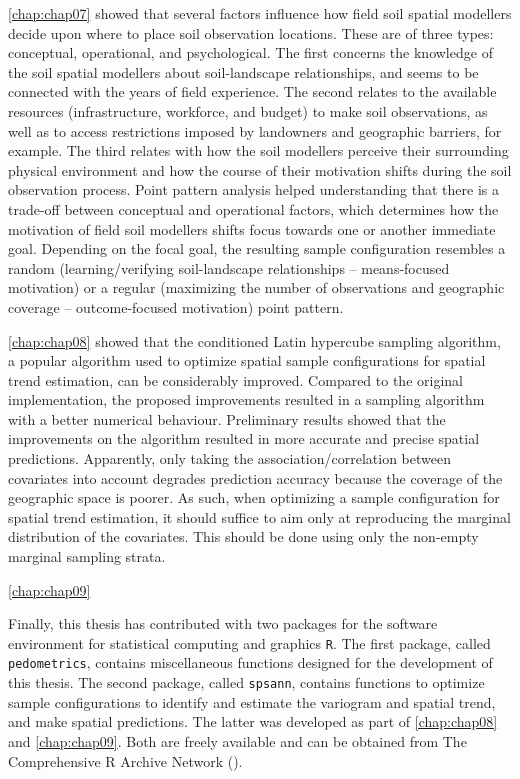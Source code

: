 \autoref{chap:chap07} showed that several factors influence how field soil spatial modellers decide upon where 
to place soil observation locations. These are of three types: conceptual, operational, and psychological. The 
first concerns the knowledge of the soil spatial modellers about soil-landscape relationships, and seems to be 
connected with the years of field experience. The second relates to the available resources (infrastructure, 
workforce, and budget) to make soil observations, as well as to access restrictions imposed by landowners and 
geographic barriers, for example. The third relates with how the soil modellers perceive their surrounding 
physical environment and how the course of their motivation shifts during the soil observation process. Point 
pattern analysis helped understanding that there is a trade-off between conceptual and operational factors, 
which determines how the motivation of field soil modellers shifts focus towards one or another immediate 
goal. 
Depending on the focal goal, the resulting sample configuration resembles a random (learning/verifying 
soil-landscape relationships -- means-focused motivation) or a regular (maximizing the number of observations 
and geographic coverage -- outcome-focused motivation) point pattern.

\autoref{chap:chap08} showed that the conditioned Latin hypercube sampling algorithm, a popular algorithm
used to optimize spatial sample configurations for spatial trend estimation, can be considerably improved. 
Compared to the original implementation, the proposed improvements resulted in a sampling algorithm 
with a better numerical behaviour. Preliminary results showed that the improvements on the algorithm 
resulted in more accurate and precise spatial predictions. Apparently, only taking the association/correlation 
between 
covariates into account degrades prediction accuracy because the coverage of the geographic space is poorer. 
As such, when optimizing a sample configuration for spatial trend estimation, it should suffice to aim only at 
reproducing the marginal distribution of the covariates. This should be done using only the non-empty 
marginal sampling strata.

\autoref{chap:chap09} 

Finally, this thesis has contributed with two packages for the software environment for statistical computing 
and graphics \texttt{R}. The first package, called \texttt{pedometrics}, contains miscellaneous functions 
designed for the development of this thesis. The second package, called \texttt{spsann}, contains functions to 
optimize sample configurations to identify and estimate the variogram and spatial trend, and make spatial 
predictions. The latter was developed as part of \autoref{chap:chap08} and \autoref{chap:chap09}. Both are 
freely available and can be obtained from The Comprehensive R Archive Network (\cran).


